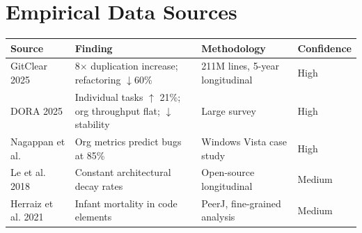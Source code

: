 \documentclass[11pt, a4paper, logo, copyright]{googledeepmind}
\begin{document}
\section{Empirical Data Sources}
\label{app:data}

\begin{center}
\begin{tabular}{lp{4cm}p{4cm}l}
\toprule
Source & Finding & Methodology & Confidence \\
\midrule
GitClear 2025 & 8$\times$ duplication increase; refactoring $\downarrow$60\% & 211M lines, 5-year longitudinal & High \\
DORA 2025 & Individual tasks $\uparrow$ 21\%; org throughput flat; $\downarrow$ stability & Large survey & High \\
Nagappan et al. & Org metrics predict bugs at 85\% & Windows Vista case study & High \\
Le et al. 2018 & Constant architectural decay rates & Open-source longitudinal & Medium \\
Herraiz et al. 2021 & Infant mortality in code elements & PeerJ, fine-grained analysis & Medium \\
\bottomrule
\end{tabular}
\end{center}
\end{document}
